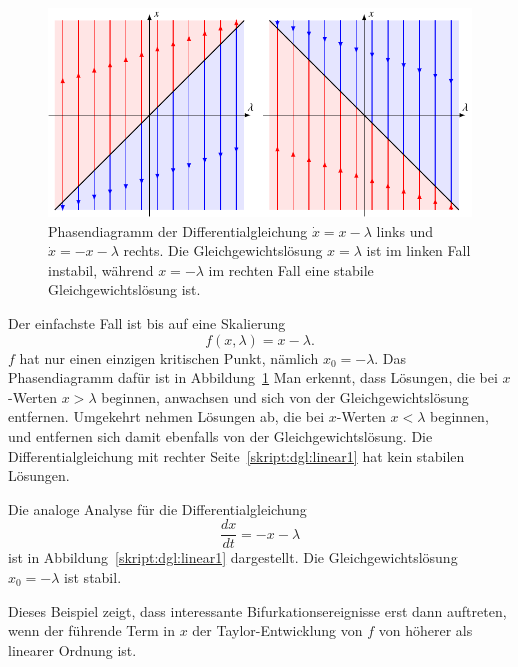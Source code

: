 \begin{beispiel}
\begin{figure}
\centering
\includegraphics{chapters/3/lin1.pdf}
\caption{
Phasendiagramm der Differentialgleichung $\dot x = x-\lambda$ links und
$\dot x = -x-\lambda$ rechts.
Die Gleichgewichtslösung $x=\lambda$ ist im linken Fall instabil,
während $x=-\lambda$ im rechten Fall eine stabile Gleichgewichtslösung ist.
\label{skript:dgl:phasen1}
}
\end{figure}%
Der einfachste Fall ist bis auf eine Skalierung
\begin{equation}
f(x,\lambda)=x-\lambda.
\label{skript:dgl:linear1}
\end{equation}
$f$ hat nur einen einzigen kritischen Punkt, nämlich $x_0=-\lambda$.
Das Phasendiagramm dafür ist in Abbildung~\ref{skript:dgl:phasen1}
Man erkennt, dass Lösungen, die bei $x$-Werten $x>\lambda$ beginnen,
anwachsen und sich von der Gleichgewichtslösung entfernen.
Umgekehrt nehmen Lösungen ab, die bei $x$-Werten $x<\lambda$ beginnen,
und entfernen sich damit ebenfalls von der Gleichgewichtslösung.
Die Differentialgleichung mit rechter Seite~\ref{skript:dgl:linear1}
hat kein stabilen Lösungen.

Die analoge Analyse für die Differentialgleichung
\[
\frac{dx}{dt} = -x-\lambda
\]
ist in Abbildung~\ref{skript:dgl:linear1} dargestellt.
Die Gleichgewichtslösung $x_0=-\lambda$ ist stabil.
\end{beispiel}

Dieses Beispiel zeigt, dass interessante Bifurkationsereignisse
erst dann auftreten, wenn der führende Term in $x$ der Taylor-Entwicklung
von $f$ von höherer als linearer Ordnung ist.


